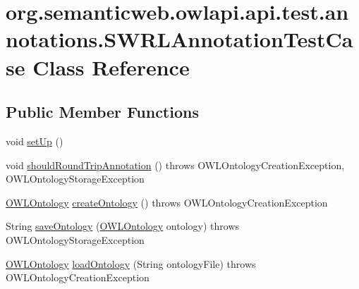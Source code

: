 \hypertarget{classorg_1_1semanticweb_1_1owlapi_1_1api_1_1test_1_1annotations_1_1_s_w_r_l_annotation_test_case}{\section{org.\-semanticweb.\-owlapi.\-api.\-test.\-annotations.\-S\-W\-R\-L\-Annotation\-Test\-Case Class Reference}
\label{classorg_1_1semanticweb_1_1owlapi_1_1api_1_1test_1_1annotations_1_1_s_w_r_l_annotation_test_case}
}
\subsection*{Public Member Functions}
\begin{DoxyCompactItemize}
\item 
void \hyperlink{classorg_1_1semanticweb_1_1owlapi_1_1api_1_1test_1_1annotations_1_1_s_w_r_l_annotation_test_case_a91669ba9c5a26e83d42cb2149bac9de3}{set\-Up} ()
\item 
void \hyperlink{classorg_1_1semanticweb_1_1owlapi_1_1api_1_1test_1_1annotations_1_1_s_w_r_l_annotation_test_case_a939826c4e59dd873d2fc5dae73544fcc}{should\-Round\-Trip\-Annotation} ()  throws O\-W\-L\-Ontology\-Creation\-Exception,             O\-W\-L\-Ontology\-Storage\-Exception 
\item 
\hyperlink{interfaceorg_1_1semanticweb_1_1owlapi_1_1model_1_1_o_w_l_ontology}{O\-W\-L\-Ontology} \hyperlink{classorg_1_1semanticweb_1_1owlapi_1_1api_1_1test_1_1annotations_1_1_s_w_r_l_annotation_test_case_a86b03d1b3b2dc66398017dea092005a8}{create\-Ontology} ()  throws O\-W\-L\-Ontology\-Creation\-Exception 
\item 
String \hyperlink{classorg_1_1semanticweb_1_1owlapi_1_1api_1_1test_1_1annotations_1_1_s_w_r_l_annotation_test_case_afb7892db5ef4003ab53be15857172845}{save\-Ontology} (\hyperlink{interfaceorg_1_1semanticweb_1_1owlapi_1_1model_1_1_o_w_l_ontology}{O\-W\-L\-Ontology} ontology)  throws O\-W\-L\-Ontology\-Storage\-Exception 
\item 
\hyperlink{interfaceorg_1_1semanticweb_1_1owlapi_1_1model_1_1_o_w_l_ontology}{O\-W\-L\-Ontology} \hyperlink{classorg_1_1semanticweb_1_1owlapi_1_1api_1_1test_1_1annotations_1_1_s_w_r_l_annotation_test_case_a2b94fada1839d6382e936ae3c35fdbdf}{load\-Ontology} (String ontology\-File)  throws O\-W\-L\-Ontology\-Creation\-Exception 
\end{DoxyCompactItemize}


